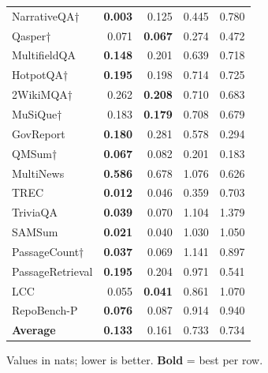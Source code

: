 \documentclass[10pt,letterpaper]{article}
\begin{document}
\begin{table}[H]
\begin{minipage}[t]{0.49\textwidth}
\begin{tabular}{@{}lrrrr@{}}
\midrule
NarrativeQA† & \textbf{0.003} & 0.125 & 0.445 & 0.780\\
Qasper† & 0.071 & \textbf{0.067} & 0.274 & 0.472\\
MultifieldQA & \textbf{0.148} & 0.201 & 0.639 & 0.718\\
HotpotQA† & \textbf{0.195} & 0.198 & 0.714 & 0.725\\
2WikiMQA† & 0.262 & \textbf{0.208} & 0.710 & 0.683\\
MuSiQue† & 0.183 & \textbf{0.179} & 0.708 & 0.679\\
GovReport & \textbf{0.180} & 0.281 & 0.578 & 0.294\\
QMSum† & \textbf{0.067} & 0.082 & 0.201 & 0.183\\
MultiNews & \textbf{0.586} & 0.678 & 1.076 & 0.626\\
TREC & \textbf{0.012} & 0.046 & 0.359 & 0.703\\
TriviaQA & \textbf{0.039} & 0.070 & 1.104 & 1.379\\
SAMSum & \textbf{0.021} & 0.040 & 1.030 & 1.050\\
PassageCount† & \textbf{0.037} & 0.069 & 1.141 & 0.897\\
PassageRetrieval & \textbf{0.195} & 0.204 & 0.971 & 0.541\\
LCC & 0.055 & \textbf{0.041} & 0.861 & 1.070\\
RepoBench-P & \textbf{0.076} & 0.087 & 0.914 & 0.940\\
\midrule
\textbf{Average} & \textbf{0.133} & 0.161 & 0.733 & 0.734\\
\bottomrule
\end{tabular}
\end{minipage}
\par\smallskip
\center Values in nats; lower is better. \textbf{Bold} = best per row.
\end{table}
\end{document}

